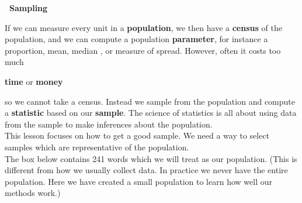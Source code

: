 ﻿\def\theTopic{Sampling }
\def\dayNum{3}

\begin{center}
{\large \bf\ Sampling}
\end{center}

If we can measure every unit in a {\bf population}, we then have a
{\bf census} of the population, and  we can 
compute a population {\bf parameter}, for instance a proportion, mean,
median , or measure of spread. However, often it costs too much
\vspace{-.4cm}
\begin{center}
  {\large\bf  time}\hspace{2cm} or\hspace{2cm} {\bf\large money}
\vspace{-.4cm}
\end{center}
      so we cannot take a census.  Instead we  sample from the
      population and compute a {\bf statistic} based on our {\bf
      sample}. The science of statistics is all about using data from
    the sample to make inferences about the population.\\
  This lesson focuses on how to  get a good sample.  We need a way to select
  samples which are representative of the population.
  \\
  The box below contains 241 words which we will treat as our
  population. (This is different from how we usually collect data. In
  practice we never have the entire population. Here we have created a 
  small population to learn how well our methods work.)  
